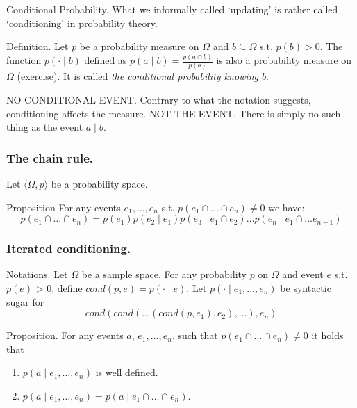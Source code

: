 \documentclass{beamer}
\begin{document}
\begin{frame}{Conditional Probability.}    
  What we informally called `updating' is rather called `conditioning' in probability theory.
  
  \begin{block}{Definition.}
    Let $p$ be a probability measure on $\Omega$ and $b \subseteq \Omega$ s.t. $p(b) > 0$. The function $p( \cdot \mid b)$ defined as $p(a \mid b) = \frac{p(a \cap b)}{p(b)}$ is also a probability measure on $\Omega$ (exercise). It is called \emph{the conditional probability knowing $b$}.
  \end{block}

  \begin{alertblock}{NO CONDITIONAL EVENT.}
    Contrary to what the notation suggests, conditioning affects the measure. NOT THE EVENT. There is simply no such thing as the event $a \mid b$. 
  \end{alertblock}
\end{frame}

\begin{frame}
  \frametitle{The chain rule.}
  Let $\langle \Omega, p \rangle$ be a probability space.

  \begin{block}{Proposition}
    For any events $e_1, \dots, e_n$ s.t. $p(e_1 \cap \dots \cap e_n) \neq 0$ we have:
    \[ p(e_1 \cap \dots \cap e_n) = p(e_1)p(e_2 \mid e_1)p(e_3 \mid e_1 \cap e_2) \dots p(e_n \mid e_1 \cap \dots e_{n-1}) \]
  \end{block}
  
\end{frame}

\begin{frame}
  \frametitle{Iterated conditioning.}

  \begin{block}{Notations.}
    Let $\Omega$ be a sample space. For any probability $p$ on $\Omega$ and event $e$ s.t. $p(e)$ > 0, define $cond(p, e) = p(\cdot \mid e)$. Let $p( \cdot \mid e_1, \dots, e_n)$ be syntactic sugar for
   \[cond(cond(\dots (cond(p, e_1), e_2), \dots), e_n)\]
  \end{block}

  \begin{block}{Proposition.}
    For any events $a$, $e_1,\dots, e_n$, such that $p(e_1 \cap \dots \cap e_n) \neq 0$ it holds that
    \begin{enumerate}
    \item $p(a \mid e_1, \dots, e_n)$ is well defined.
    \item $p(a \mid e_1, \dots, e_n) = p(a \mid e_1 \cap \dots \cap e_n)$.
    \end{enumerate}
  \end{block}
\end{frame}
\end{document}
